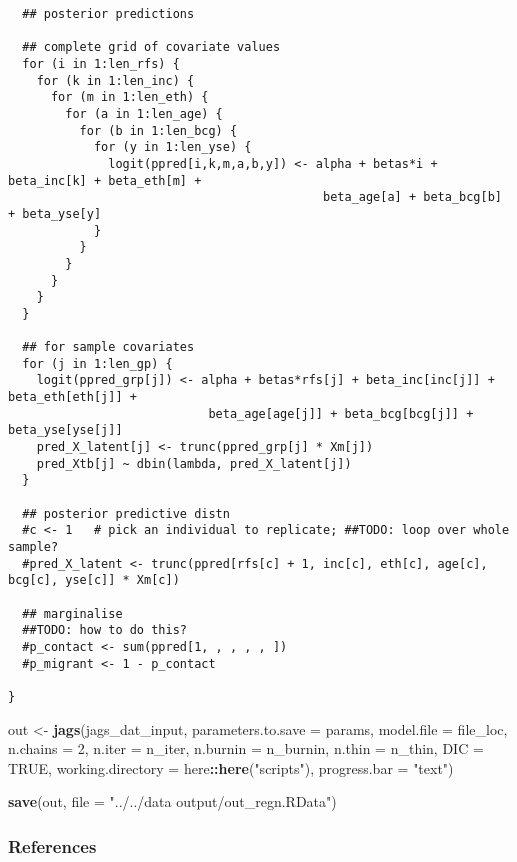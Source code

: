 \documentclass[]{article}
\newenvironment{Shaded}{\begin{snugshade}}{\end{snugshade}}
\newcommand{\DataTypeTok}[1]{\textcolor[rgb]{0.13,0.29,0.53}{#1}}
\newcommand{\DecValTok}[1]{\textcolor[rgb]{0.00,0.00,0.81}{#1}}
\newcommand{\KeywordTok}[1]{\textcolor[rgb]{0.13,0.29,0.53}{\textbf{#1}}}
\newcommand{\NormalTok}[1]{#1}
\newcommand{\OperatorTok}[1]{\textcolor[rgb]{0.81,0.36,0.00}{\textbf{#1}}}
\newcommand{\OtherTok}[1]{\textcolor[rgb]{0.56,0.35,0.01}{#1}}
\newcommand{\StringTok}[1]{\textcolor[rgb]{0.31,0.60,0.02}{#1}}
\begin{document}
\begin{verbatim}
  ## posterior predictions

  ## complete grid of covariate values
  for (i in 1:len_rfs) {
    for (k in 1:len_inc) {
      for (m in 1:len_eth) {
        for (a in 1:len_age) {
          for (b in 1:len_bcg) {
            for (y in 1:len_yse) {
              logit(ppred[i,k,m,a,b,y]) <- alpha + betas*i + beta_inc[k] + beta_eth[m] +
                                            beta_age[a] + beta_bcg[b] + beta_yse[y]
            }
          }
        }
      }
    }
  }

  ## for sample covariates
  for (j in 1:len_gp) {
    logit(ppred_grp[j]) <- alpha + betas*rfs[j] + beta_inc[inc[j]] + beta_eth[eth[j]] +
                            beta_age[age[j]] + beta_bcg[bcg[j]] + beta_yse[yse[j]]
    pred_X_latent[j] <- trunc(ppred_grp[j] * Xm[j])
    pred_Xtb[j] ~ dbin(lambda, pred_X_latent[j])
  }

  ## posterior predictive distn
  #c <- 1   # pick an individual to replicate; ##TODO: loop over whole sample?
  #pred_X_latent <- trunc(ppred[rfs[c] + 1, inc[c], eth[c], age[c], bcg[c], yse[c]] * Xm[c])

  ## marginalise
  ##TODO: how to do this?
  #p_contact <- sum(ppred[1, , , , , ])
  #p_migrant <- 1 - p_contact

}
\end{verbatim}

\begin{Shaded}
\begin{Highlighting}[]
\NormalTok{out <-}\StringTok{ }\KeywordTok{jags}\NormalTok{(jags_dat_input,}
            \DataTypeTok{parameters.to.save =}\NormalTok{ params,}
            \DataTypeTok{model.file =}\NormalTok{ file_loc,}
            \DataTypeTok{n.chains =} \DecValTok{2}\NormalTok{,}
            \DataTypeTok{n.iter =}\NormalTok{ n_iter,}
            \DataTypeTok{n.burnin =}\NormalTok{ n_burnin,}
            \DataTypeTok{n.thin =}\NormalTok{ n_thin,}
            \DataTypeTok{DIC =} \OtherTok{TRUE}\NormalTok{,}
            \DataTypeTok{working.directory =}\NormalTok{ here}\OperatorTok{::}\KeywordTok{here}\NormalTok{(}\StringTok{"scripts"}\NormalTok{),}
            \DataTypeTok{progress.bar =} \StringTok{"text"}\NormalTok{)}

\KeywordTok{save}\NormalTok{(out, }\DataTypeTok{file =} \StringTok{"../../data output/out_regn.RData"}\NormalTok{)}
\end{Highlighting}
\end{Shaded}

\hypertarget{references}{%
\subsubsection{References}\label{references}}
\end{document}
